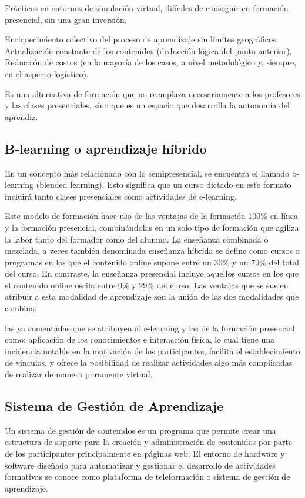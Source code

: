 Prácticas en entornos de simulación virtual, difíciles de conseguir en formación presencial, sin una gran inversión.

Enriquecimiento colectivo del proceso de aprendizaje sin límites geográficos.
Actualización constante de los contenidos (deducción lógica del punto anterior).
Reducción de costos (en la mayoría de los casos, a nivel metodológico y, siempre, en el aspecto logístico).


Es una alternativa de formación que no reemplaza necesariamente a los profesores y las clases presenciales, sino que es un espacio que desarrolla la autonomía del aprendiz.

\subsection{B-learning o aprendizaje híbrido}

En un concepto más relacionado con lo semipresencial, se encuentra el llamado b-learning (blended learning). Esto significa que un curso dictado en este formato incluirá tanto clases presenciales como actividades de e-learning.

Este modelo de formación hace uso de las ventajas de la formación 100\% en línea y la formación presencial, combinándolas en un solo tipo de formación que agiliza la labor tanto del formador como del alumno. La enseñanza combinada o mezclada, a veces también denominada enseñanza híbrida se define como cursos o programas en los que el contenido online supone entre un 30\% y un 70\% del total del curso. En contraste, la enseñanza presencial incluye aquellos cursos en los que el contenido online oscila entre 0\% y 29\% del curso. Las ventajas que se suelen atribuir a esta modalidad de aprendizaje son la unión de las dos modalidades que combina:

las ya comentadas que se atribuyen al e-learning y las de la formación presencial como: aplicación de los conocimientos e interacción física, lo cual tiene una incidencia notable en la motivación de los participantes, facilita el establecimiento de vínculos, y ofrece la posibilidad de realizar actividades algo más complicadas de realizar de manera puramente virtual.

\subsection{Sistema de Gestión de Aprendizaje}

Un sistema de gestión de contenidos es un programa que permite crear una estructura de soporte para la creación y administración de contenidos por parte de los participantes principalmente en páginas web. El entorno de hardware y software diseñado para automatizar y gestionar el desarrollo de actividades formativas se conoce como plataforma de teleformación o sistema de gestión de aprendizaje.

